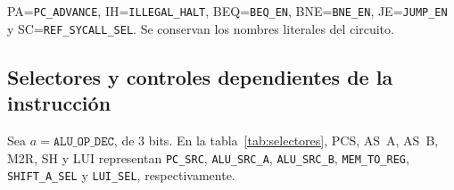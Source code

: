 \documentclass[11pt,a4paper]{article}
\newcommand{\sig}[1]{\texttt{#1}}
\begin{document}
{\raggedright
PA=\sig{PC\_ADVANCE}, IH=\sig{ILLEGAL\_HALT}, BEQ=\sig{BEQ\_EN},
BNE=\sig{BNE\_EN}, JE=\sig{JUMP\_EN} y SC=\sig{REF\_SYCALL\_SEL}.
Se conservan los nombres literales del circuito.\par}



\clearpage
\subsection{Selectores y controles dependientes de la instrucción}

Sea $a=\sig{ALU\_OP\_DEC}$, de 3 bits. En la tabla~\ref{tab:selectores},
PCS, AS~A, AS~B, M2R, SH y LUI representan \sig{PC\_SRC},
\sig{ALU\_SRC\_A}, \sig{ALU\_SRC\_B}, \sig{MEM\_TO\_REG},
\sig{SHIFT\_A\_SEL} y \sig{LUI\_SEL}, respectivamente.
\end{document}
